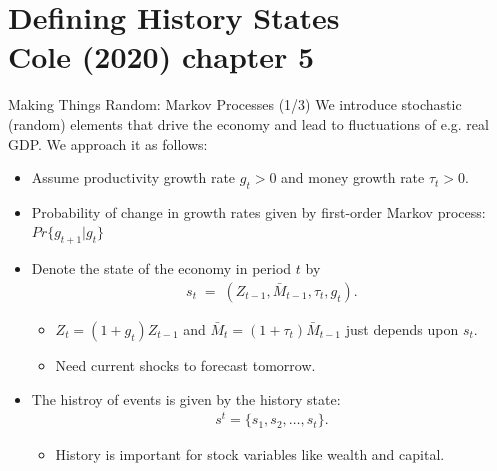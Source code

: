 \documentclass[10pt,c,aspectratio=1610,handout]{beamer}
\begin{document}
\section{Defining History States\\{\small Cole (2020) chapter 5}}%
\begin{frame}{Making Things Random: Markov Processes (1/3)}%
  We introduce stochastic (random) elements that drive the economy and lead to fluctuations of e.g. real GDP. We approach it as follows:%
  \pause%
  \begin{itemize}%
    \item[$\blacktriangleright$] Assume productivity growth rate $g_t>0$ and money growth rate $\tau_t>0$.%
    \item[$\blacktriangleright$] Probability of change in growth rates given by first-order Markov process: $Pr\{g_{t+1}|g_{t}\}$%
    \pause%
    \item[$\blacktriangleright$] Denote the state of the economy in period $t$ by%
    \begin{align*}%
      s_{t} \; = \; \left( Z_{t-1},\bar{M}_{t-1},\tau _{t},g_{t}\right).%
    \end{align*}%
    \vspace*{-0.2in}%
    \begin{itemize}%
      \item[$\rightarrow$] $Z_t = (1+g_t)Z_{t-1}$ and $\bar M_{t} = (1+\tau_t) \bar M_{t-1}$ just depends upon $s_t$.%
      \item[$\rightarrow$] Need current shocks to forecast tomorrow.%
    \end{itemize}%
    \pause%
    \item[$\blacktriangleright$] The histroy of events is given by the history state:%
    \begin{align*}%
      s^{t} = \{s_1, s_2, \ldots, s_t \}.%
    \end{align*}%
    \vspace*{-0.2in}%
    \begin{itemize}%
      \item[$\rightarrow$] History is important for stock variables like wealth and capital.%
    \end{itemize}%
  \end{itemize}%
\end{frame}%
\end{document}
